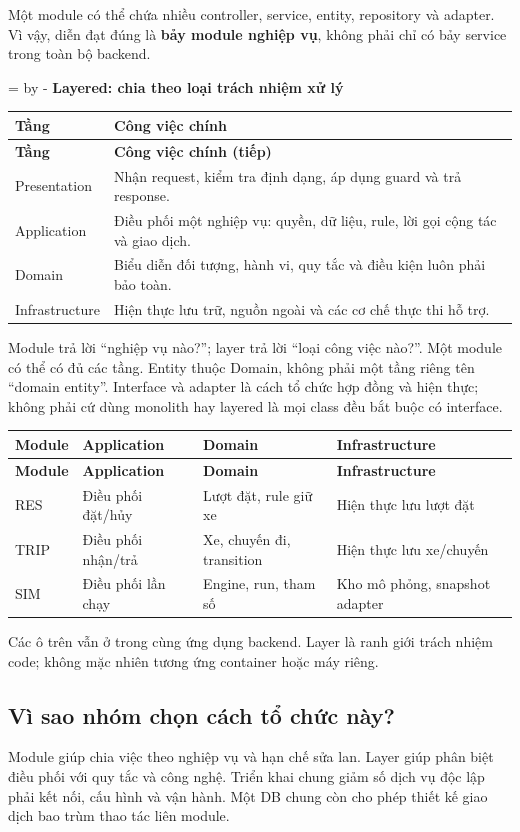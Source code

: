 \documentclass[12pt,a4paper]{article}
\newcommand{\Needspace}[1]{%
  \par\begingroup\dimen0=\pagegoal\advance\dimen0 by -\pagetotal
  \ifdim\dimen0<#1\relax\newpage\fi\endgroup}
\newcommand{\Point}[1]{\par\medskip\Needspace{4\baselineskip}\noindent\textbf{#1}\par\nobreak\smallskip}
\newenvironment{PairTable}[2]{%
  \begin{longtable}{|L{39mm}|L{106mm}|}\hline
  \textbf{#1} & \textbf{#2}\\\hline\endfirsthead
  \hline\textbf{#1} & \textbf{#2 (tiếp)}\\\hline\endhead
}{\end{longtable}}
\begin{document}
Một module có thể chứa nhiều controller, service, entity, repository và adapter. Vì vậy, diễn đạt đúng là \textbf{bảy module nghiệp vụ}, không phải chỉ có bảy service trong toàn bộ backend.

\Point{Layered: chia theo loại trách nhiệm xử lý}
\begin{PairTable}{Tầng}{Công việc chính}
Presentation & Nhận request, kiểm tra định dạng, áp dụng guard và trả response.\\\hline
Application & Điều phối một nghiệp vụ: quyền, dữ liệu, rule, lời gọi cộng tác và giao dịch.\\\hline
Domain & Biểu diễn đối tượng, hành vi, quy tắc và điều kiện luôn phải bảo toàn.\\\hline
Infrastructure & Hiện thực lưu trữ, nguồn ngoài và các cơ chế thực thi hỗ trợ.\\\hline
\end{PairTable}

Module trả lời ``nghiệp vụ nào?''; layer trả lời ``loại công việc nào?''. Một module có thể có đủ các tầng. Entity thuộc Domain, không phải một tầng riêng tên ``domain entity''. Interface và adapter là cách tổ chức hợp đồng và hiện thực; không phải cứ dùng monolith hay layered là mọi class đều bắt buộc có interface.

\begin{longtable}{|L{26mm}|L{36mm}|L{36mm}|L{39mm}|}\hline
\textbf{Module} & \textbf{Application} & \textbf{Domain} & \textbf{Infrastructure}\\\hline\endfirsthead
\hline\textbf{Module} & \textbf{Application} & \textbf{Domain} & \textbf{Infrastructure}\\\hline\endhead
RES & Điều phối đặt/hủy & Lượt đặt, rule giữ xe & Hiện thực lưu lượt đặt\\\hline
TRIP & Điều phối nhận/trả & Xe, chuyến đi, transition & Hiện thực lưu xe/chuyến\\\hline
SIM & Điều phối lần chạy & Engine, run, tham số & Kho mô phỏng, snapshot adapter\\\hline
\end{longtable}

Các ô trên vẫn ở trong cùng ứng dụng backend. Layer là ranh giới trách nhiệm code; không mặc nhiên tương ứng container hoặc máy riêng.

\subsection{Vì sao nhóm chọn cách tổ chức này?}
Module giúp chia việc theo nghiệp vụ và hạn chế sửa lan. Layer giúp phân biệt điều phối với quy tắc và công nghệ. Triển khai chung giảm số dịch vụ độc lập phải kết nối, cấu hình và vận hành. Một DB chung còn cho phép thiết kế giao dịch bao trùm thao tác liên module.
\end{document}
